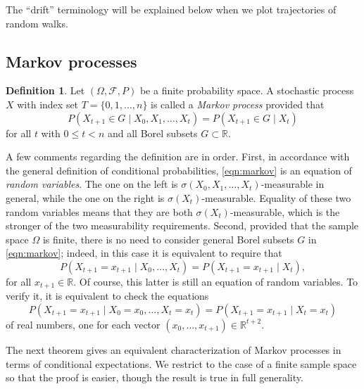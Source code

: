 \documentclass[11pt]{book}
\theoremstyle{definition}
\newtheorem{defn}[thm]{Definition}
\numberwithin{equation}{section}
\begin{document}
The ``drift'' terminology will be explained below when we plot trajectories of random walks.

\subsection{Markov processes}

\begin{defn}
	Let $(\Omega, \mathcal{F}, P)$ be a finite probability space. A stochastic process $X$ with index set $T = \{0,1,\ldots,n\}$ is called a \textit{Markov process} provided that
	\begin{equation}\label{eqn:markov}
		P(X_{t+1} \in G \mid X_0,X_1,\ldots,X_t) = P(X_{t+1} \in G \mid X_t)
	\end{equation}
	for all $t$ with $0\leq t < n$ and all Borel subsets $G\subset \mathbb{R}$.
\end{defn}

A few comments regarding the definition are in order. First, in accordance with the general definition of conditional probabilities, \eqref{eqn:markov} is an equation of \textit{random variables}. The one on the left is $\sigma(X_0,X_1,\ldots,X_t)$-measurable in general, while the one on the right is $\sigma(X_t)$-measurable. Equality of these two random variables means that they are both $\sigma(X_t)$-measurable, which is the stronger of the two measurability requirements. Second, provided that the sample space $\Omega$ is finite, there is no need to consider general Borel subsets $G$ in \eqref{eqn:markov}; indeed, in this case it is equivalent to require that
\begin{equation}\label{eqn:markov-2}
	P\left( X_{t+1} = x_{t+1} \mid X_0, \ldots,X_t \right) = P \left( X_{t+1} = x_{t+1} \mid X_t \right),
\end{equation}
for all $x_{t+1}\in \mathbb{R}$. Of course, this latter is still an equation of random variables. To verify it, it is equivalent to check the equations
\[
	P\left( X_{t+1} = x_{t+1} \mid X_0=x_0, \ldots,X_t=x_t \right) = P \left( X_{t+1} = x_{t+1} \mid X_t=x_t \right)
\]
of real numbers, one for each vector $(x_0,\ldots,x_{t+1})\in \mathbb{R}^{t+2}$.

The next theorem gives an equivalent characterization of Markov processes in terms of conditional expectations. We restrict to the case of a finite sample space so that the proof is easier, though the result is true in full generality.
\end{document}
